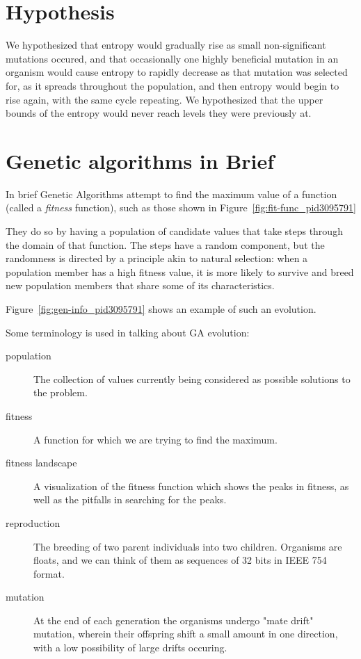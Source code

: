 \documentclass[11pt]{article}
\begin{document}
\section{Hypothesis}
\label{sec:org26a3be1}
We hypothesized that entropy would gradually rise as small non-significant
mutations occured, and that occasionally one highly beneficial mutation in
an organism would cause entropy to rapidly decrease as that mutation was
selected for, as it spreads throughout the population, and then entropy would
begin to rise again, with the same cycle repeating. We hypothesized that the
upper bounds of the entropy would never reach levels they were previously at.


\section{Genetic algorithms in Brief}

In brief Genetic Algorithms attempt to find the maximum value of a
function (called a \emph{fitness} function), such as those shown in
Figure~\ref{fig:fit-func_pid3095791}

They do so by having a population of candidate values that take steps
through the domain of that function.  The steps have a random
component, but the randomness is directed by a principle akin to
natural selection: when a population member has a high fitness value,
it is more likely to survive and breed new population members that
share some of its characteristics.

Figure~\ref{fig:gen-info_pid3095791} shows an example of such an
evolution.

Some terminology is used in talking about GA evolution:

\begin{description}
\item[population] The collection of values currently being considered
  as possible solutions to the problem.
\item[fitness] A function for which we are trying to find the maximum.
\item[fitness landscape] A visualization of the fitness function which
  shows the peaks in fitness, as well as the pitfalls in searching for
  the peaks.
\item[reproduction] The breeding of two parent individuals into two children. Organisms are
floats, and we can think of them as sequences of 32 bits in IEEE 754 format.
\item[mutation] At the end of each generation the organisms undergo "mate drift" mutation, 
wherein their offspring shift a small amount in one direction, with a low possibility 
of large drifts occuring.
\end{description}
\end{document}
